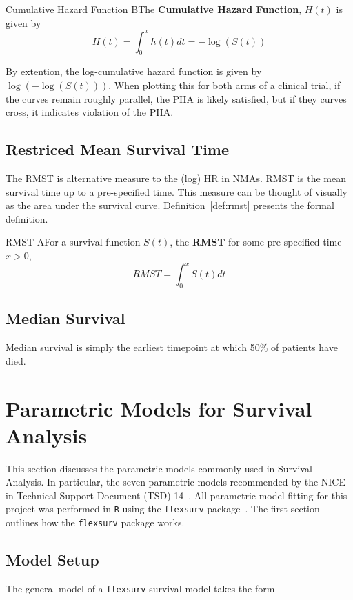 \begin{definition}{Cumulative Hazard Function}
    BThe \textbf{Cumulative Hazard Function}, $H(t)$ is given by 
    \[
        H(t) = \int_{0}^{x}h(t)dt = -\log(S(t))  
    \]
\end{definition}

By extention, the log-cumulative hazard function is given by $\log(-\log(S(t)))$. When plotting this for both arms of a clinical trial, if the curves remain roughly parallel, the PHA is likely satisfied, but if they curves cross, it indicates violation of the PHA.

\subsection{Restriced Mean Survival Time}
The RMST is alternative measure to the (log) HR in NMAs. RMST is the mean survival time up to a pre-specified time. This measure can be thought of visually as the area under the survival curve. Definition~\ref{def:rmst} presents the formal definition.

\begin{definition}{RMST}
    AFor a survival function $S(t)$, the \textbf{RMST} for some pre-specified time $x > 0$,
    \[
        RMST = \int_{0}^{x} S(t)dt
    \] 
    \label{def:rmst}
\end{definition}

\subsection{Median Survival}
Median survival is simply the earliest timepoint at which 50\% of patients have died. 

\section{Parametric Models for Survival Analysis}
This section discusses the parametric models commonly used in Survival Analysis. In particular, the seven parametric models recommended by the NICE in Technical Support Document (TSD) 14~\cite{tsd14}. All parametric model fitting for this project was performed in \verb|R| using the \verb|flexsurv| package~\cite{flexsurv}. The first section outlines how the \verb|flexsurv| package works.

\subsection{Model Setup}
The general model of a \verb|flexsurv| survival model takes the form 

